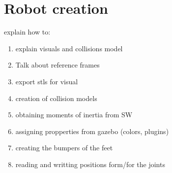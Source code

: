 \section{Robot creation} %
\label{sec:robot_creation}
explain how to:
\begin{enumerate}
  \item explain visuals and collisions model
  \item Talk about reference frames
  \item export stls for visual
  \item creation of collision models
  \item obtaining moments of inertia from SW
  \item assigning propperties from gazebo (colors, plugins)
  \item creating the bumpers of the feet
  \item reading and writting positions form/for the joints
\end{enumerate}

